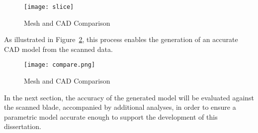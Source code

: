 \begin{figure}[H]
    \centering
    \texttt{[image: slice]}
    \caption{Mesh and CAD Comparison}
    \label{fig:slice}
\end{figure}

As illustrated in Figure~\ref{fig:compare.png}, this process enables the generation of an accurate CAD model from the scanned data.

\begin{figure}[H]
    \centering
    \texttt{[image: compare.png]}
    \caption{Mesh and CAD Comparison}
    \label{fig:compare.png}
\end{figure}

In the next section, the accuracy of the generated model will be evaluated against the scanned blade, accompanied by additional analyses, in order to ensure a parametric model accurate enough to support the development of this dissertation.
